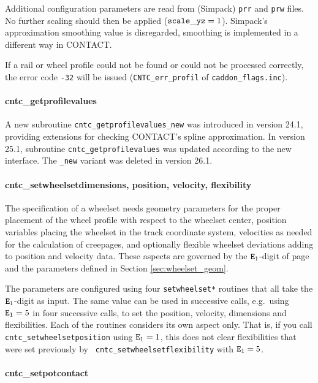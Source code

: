 \documentclass[12pt]{report}
\begin{document}
Additional configuration parameters are read from (Simpack) {\tt prr} and
{\tt prw} files. No further scaling should then be applied (${\tt
scale\_yz}=1$). Simpack's approximation smoothing value is disregarded,
smoothing is implemented in a different way in CONTACT.

If a rail or wheel profile could not be found or could not be processed
correctly, the error code {\tt -32} will be issued ({\tt CNTC\_err\_profil}
of {\tt caddon\_flags.inc}). 

\paragraph{cntc\_getprofilevalues}

A new subroutine {\tt cntc\_getprofilevalues\_new} was introduced in version
24.1, providing extensions for checking CONTACT's spline approximation.
In version 25.1, subroutine {\tt cntc\_getprofilevalues} was updated
according to the new interface. The {\tt \_new} variant was deleted in
version 26.1.

\paragraph{cntc\_setwheelsetdimensions, position, velocity, flexibility}

The specification of a wheelset needs geometry parameters for the proper
placement of the wheel profile with respect to the wheelset center,
position variables placing the wheelset in the track coordinate system,
velocities as needed for the calculation of creepages, and optionally
flexible wheelset deviations adding to position and velocity data.
These aspects are governed by the ${\tt E}_1$-digit of page
\pageref{e1-digit} and the parameters defined in Section 
\ref{sec:wheelset_geom}. 

The parameters are configured using four {\tt setwheelset*} routines that
all take the ${\tt E}_1$-digit as input. The same value can be used in
successive calls, e.g.\ using ${\tt E}_1=5$ in four successive calls, to set
the position, velocity, dimensions and flexibilities. Each of the routines
considers its own aspect only. That is, if you call {\tt 
cntc\_setwheelsetposition} using ${\tt E}_1=1$, this does not clear
flexibilities that were set previously by {\tt 
cntc\_setwheelsetflexibility} with ${\tt E}_1=5$.

\paragraph{cntc\_setpotcontact}
\end{document}
